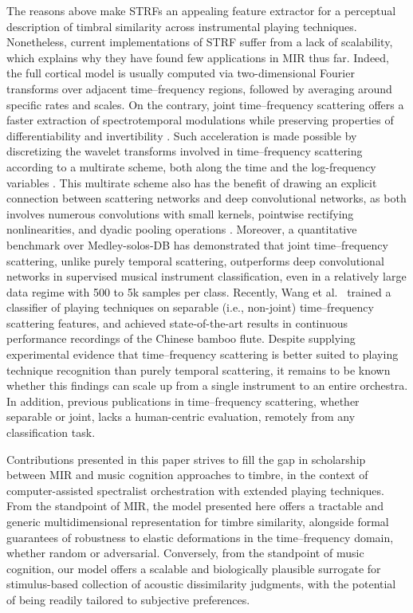 \documentclass{bmcart}
\makeatletter
\newcommand*{\ie}{i.e.,\@\xspace}
\makeatother
\begin{document}
The reasons above make STRFs an appealing feature extractor for a perceptual description of timbral similarity across instrumental playing techniques.
Nonetheless, current implementations of STRF suffer from a lack of scalability, which explains why they have found few applications in MIR thus far.
Indeed, the full cortical model is usually computed via two-dimensional Fourier transforms over adjacent time--frequency regions, followed by averaging around specific rates and scales.
On the contrary, joint time--frequency scattering offers a faster extraction of spectrotemporal modulations while preserving properties of differentiability \cite{andreux2019jmlr} and invertibility \cite{lostanlen2019dafx}.
Such acceleration is made possible by discretizing the wavelet transforms involved in time--frequency scattering according to a multirate scheme, both along the time and the log-frequency variables \cite{anden2019tsp}.
This multirate scheme also has the benefit of drawing an explicit connection between scattering networks and deep convolutional networks, as both involves numerous convolutions with small kernels, pointwise rectifying nonlinearities, and dyadic pooling operations \cite{mallat2016philtrans}.
Moreover, a quantitative benchmark over Medley-solos-DB has demonstrated that joint time--frequency scattering, unlike purely temporal scattering, outperforms deep convolutional networks in supervised musical instrument classification, even in a relatively large data regime with 500 to 5k samples per class.
Recently, Wang et al.~\cite{wang2019ismir} trained a classifier of playing techniques on separable (\ie{} non-joint) time--frequency scattering features, and achieved state-of-the-art results in continuous performance recordings of the Chinese bamboo flute.
Despite supplying experimental evidence that time--frequency scattering is better suited to playing technique recognition than purely temporal scattering, it remains to be known whether this findings can scale up from a single instrument to an entire orchestra.
In addition, previous publications in time--frequency scattering, whether separable or joint, lacks a human-centric evaluation, remotely from any classification task.

Contributions presented in this paper strives to fill the gap in scholarship between MIR and music cognition approaches to timbre, in the context of computer-assisted spectralist orchestration with extended playing techniques.
From the standpoint of MIR, the model presented here offers a tractable and generic multidimensional representation for timbre similarity, alongside formal guarantees of robustness to elastic deformations in the time--frequency domain, whether random or adversarial.
Conversely, from the standpoint of music cognition, our model offers a scalable and biologically plausible surrogate for stimulus-based collection of acoustic dissimilarity judgments, with the potential of being readily tailored to subjective preferences.
\end{document}
